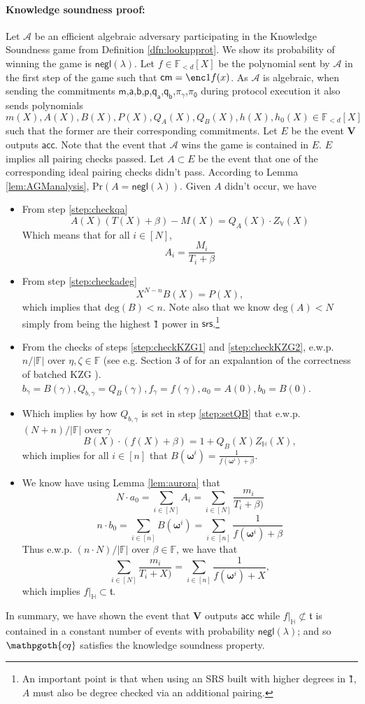 \documentclass[11pt]{article} %
\newcommand{\cq}{\ensuremath{\mathpgoth{cq} }\xspace}
\newcommand{\F}{\ensuremath{\mathbb F}\xspace}
\newcommand{\adv}{\ensuremath{\mathcal A}\xspace}
\newcommand{\srs}{\ensuremath{\mathsf{srs}}\xspace}
\newcommand{\cm}{\ensuremath{\mathsf{cm}}\xspace}
\renewcommand{\deg}{\ensuremath{\mathrm{deg}}\xspace}
\newcommand{\negl}{\ensuremath{\mathsf{negl}(\lambda)}\xspace}
\newcommand{\acc}{\ensuremath{\mathsf{acc}}\xspace}
\newcommand{\ver}{\ensuremath{\mathsf{\mathbf{V}}}\xspace}
\newcommand{\hgen}{\ensuremath{\mathbf{\omega}}\xspace}
\newcommand{\polysofdeg}[1]{\ensuremath{\F_{< #1}[X]}\xspace}
\newcommand{\prob}{\ensuremath{\mathrm{Pr}}\xspace}
\newcommand{\restricttoset}[2]{\ensuremath{#1|_{#2}}\xspace}
\newcommand{\subspace}{\ensuremath{\mathbb{H}}\xspace}
\newcommand{\bigspace}{\ensuremath{\mathbb{V}}\xspace}
\newcommand{\witsize}{\ensuremath{n}\xspace}
\newcommand{\tabsize}{\ensuremath{N}\xspace}
\newcommand{\tab}{\ensuremath{\mathfrak{t}}\xspace}
\renewcommand{\a}{\ensuremath{\mathsf{a}}\xspace}
\renewcommand{\b}{\ensuremath{\mathsf{b}}\xspace}
\renewcommand{\p}{\ensuremath{\mathsf{p}}\xspace}
\newcommand{\qa}{\ensuremath{\mathsf{q_a}}\xspace}
\newcommand{\qb}{\ensuremath{\mathsf{q_b}}\xspace}
\newcommand{\m}{\ensuremath{\mathsf{m}}\xspace}
\newcommand{\gamproof}{\ensuremath{\mathsf{\pi_\gamma}}\xspace}
\newcommand{\zerproof}{\ensuremath{\mathsf{\pi_0}}\xspace}
\newcommand{\bgam}{\ensuremath{b_\gamma}\xspace}
\newcommand{\qbgam}{\ensuremath{Q_{b,\gamma}}\xspace}
\newcommand{\fgam}{\ensuremath{f_{\gamma}}\xspace}
\begin{document}
\paragraph{Knowledge soundness proof:}
Let \adv be an efficient algebraic adversary participating in the Knowledge Soundness game from
Definition \ref{dfn:lookupprot}.
We show its probability of winning the game is \negl.
Let $f\in \polysofdeg{d}$ be the polynomial sent by \adv in the first step of the game
such that $\cm=\enc1{f(x)}$.
As \adv is algebraic, when sending the commitments \m,\a,\b,\p,\qa,\qb,\gamproof,\zerproof during protocol execution it also sends polynomials $m(X),A(X),B(X),P(X),Q_A(X),Q_B(X),h(X),h_0(X)\in \polysofdeg{d}$ such that the former are their corresponding commitments.
Let $E$ be the event \ver outputs \acc.
Note that the event that \adv wins the game is contained in $E$. 
$E$ implies all pairing checks passed.
Let $A\subset E$ be the event that one of the corresponding ideal pairing checks didn't pass.
According to Lemma \ref{lem:AGManalysis}, $\prob(A=\negl)$.
Given $A$ didn't occur, we have
\begin{itemize}
 \item From step \ref{step:checkqa} \[A(X)(T(X)+\beta)-M(X) = Q_A(X)\cdot Z_\bigspace(X)\]
Which means that for all $i\in [\tabsize]$,
\[A_i=\frac{M_i}{T_i+\beta}\]

\item From step  \ref{step:checkadeg}
\[X^{\tabsize-\witsize}B(X)=P(X),\]
which implies  that  $\deg(B)<\witsize$. Note also that we know $\deg(A)<\tabsize$ simply from \enc1{x^{\tabsize-1}} being the highest \G1 power in \srs.\footnote{An important
point is that when using an SRS built with higher degrees in \G1, $A$ must also be degree checked via an additional pairing.}

\item From the checks of steps \ref{step:checkKZG1} and \ref{step:checkKZG2},  e.w.p. $\witsize/|\F|$ over $\eta,\zeta\in\F$ (see e.g. Section 3 of \cite{plonk} for an expalantion of the correctness of batched KZG \cite{kate}). 
$\bgam = B(\gamma),\qbgam =Q_B(\gamma),\fgam =f(\gamma),a_0=A(0),b_0=B(0)$.

\item Which implies by how \qbgam is set in step \ref{step:setQB}  that e.w.p. $(\tabsize+ \witsize)/|\F|$ over $\gamma$ 
\[B(X)\cdot (f(X)+\beta)=1+ Q_B(X)Z_\subspace(X),\]
which implies for all $i\in [\witsize]$ that
$B(\hgen^i)=\frac{1}{f(\hgen^i)+\beta}$.
\item We know have using Lemma \ref{lem:aurora} that
\[\tabsize\cdot a_0 = \sum_{i\in [\tabsize]} A_i = \sum_{i\in [\tabsize]}\frac{m_i}{T_i+\beta)}\]
\[\witsize\cdot b_0 = \sum_{i\in [\witsize]} B(\hgen^i) = \sum_{i\in [\witsize]}\frac{1}{f(\hgen^i)+\beta}\]
Thus e.w.p. $(\witsize\cdot \tabsize)/|\F|$ over $\beta\in \F$, we have that
\[\sum_{i\in [\tabsize]}\frac{m_i}{T_i+X)}=\sum_{i\in [\witsize]}\frac{1}{f(\hgen^i)+X},\]
which implies $\restricttoset{f}{\subspace}\subset \tab$.
\end{itemize}
In summary, we have shown the event that \ver outputs \acc while $\restricttoset{f}{\subspace}\not\subset \tab$
is contained in a constant number of events with probability \negl; and so \cq satisfies the knowledge soundness property.


\end{document}
